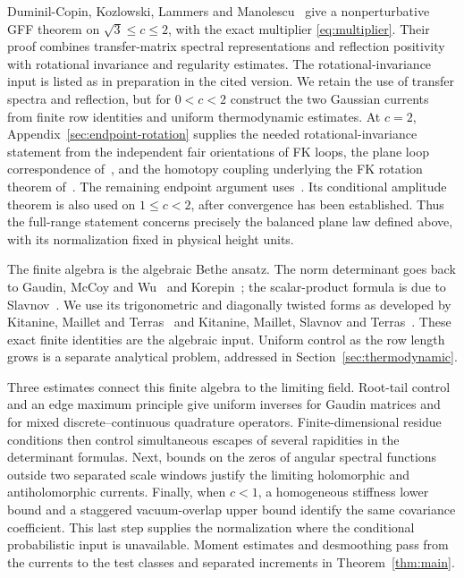 Duminil-Copin, Kozlowski, Lammers and Manolescu~\cite{DKLM2026} give a
nonperturbative GFF theorem on \(\sqrt3\le c\le2\), with the exact
multiplier \eqref{eq:multiplier}. Their proof combines transfer-matrix
spectral representations and reflection positivity with rotational
invariance and regularity estimates. The rotational-invariance input is
listed as in preparation in the cited version. We retain the use of
transfer spectra and reflection, but for \(0<c<2\) construct the two
Gaussian currents from finite row identities and uniform thermodynamic
estimates. At \(c=2\), Appendix~\ref{sec:endpoint-rotation} supplies the
needed rotational-invariance statement from the independent fair
orientations of FK loops, the plane loop correspondence of~\cite{Lis2021},
and the homotopy coupling underlying the FK rotation theorem
of~\cite{DCKKMO2026Rotation}. The remaining endpoint
argument uses~\cite{DKLM2026}. Its conditional amplitude theorem is also
used on \(1\le c<2\), after convergence has been established. Thus the
full-range statement concerns precisely the balanced plane law defined
above, with its normalization fixed in physical height units.

The finite algebra is the algebraic Bethe ansatz. The norm determinant
goes back to Gaudin, McCoy and Wu~\cite{GaudinMcCoyWu1981} and
Korepin~\cite{Korepin1982}; the scalar-product formula is due to
Slavnov~\cite{Slavnov1989}. We use its trigonometric and diagonally
twisted forms as developed by Kitanine, Maillet and
Terras~\cite{KMT1999} and Kitanine, Maillet, Slavnov and
Terras~\cite{KMST2005}. These exact finite identities are the algebraic
input. Uniform control as the row length grows is a separate analytical
problem, addressed in Section~\ref{sec:thermodynamic}.

Three estimates connect this finite algebra to the limiting field.
Root-tail control and an edge maximum principle give uniform inverses
for Gaudin matrices and for mixed discrete--continuous quadrature
operators. Finite-dimensional residue conditions then control simultaneous
escapes of several rapidities in the determinant formulas. Next, bounds
on the zeros of angular spectral functions outside two separated scale
windows justify the limiting holomorphic and antiholomorphic currents.
Finally, when \(c<1\), a homogeneous stiffness lower bound and a
staggered vacuum-overlap upper bound identify the same covariance
coefficient. This last step supplies the normalization where the
conditional probabilistic input is unavailable. Moment estimates and
desmoothing pass from the currents to the test classes and separated
increments in Theorem~\ref{thm:main}.

